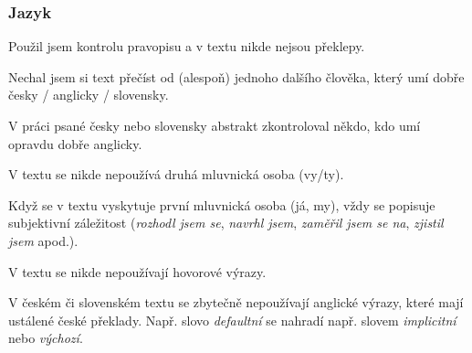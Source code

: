 \subsubsection*{Jazyk}
\begin{checklist}
    \item Použil jsem kontrolu pravopisu a v textu nikde nejsou překlepy.
	\item Nechal jsem si text přečíst od (alespoň) jednoho dalšího člověka, který umí dobře česky / anglicky / slovensky.
	\item V práci psané česky nebo slovensky abstrakt zkontroloval někdo, kdo umí opravdu dobře anglicky.
	\item V textu se nikde nepoužívá druhá mluvnická osoba (vy/ty).
	\item Když se v textu vyskytuje první mluvnická osoba (já, my), vždy se popisuje subjektivní záležitost (\textit{rozhodl jsem se}, \textit{navrhl jsem}, \textit{zaměřil jsem se na}, \textit{zjistil jsem} apod.).
	\item V textu se nikde nepoužívají hovorové výrazy.
	\item V českém či slovenském textu se zbytečně nepoužívají anglické výrazy, které mají ustálené české překlady. Např. slovo \textit{defaultní} se nahradí např. slovem \textit{implicitní} nebo \textit{výchozí}.
\end{checklist}

